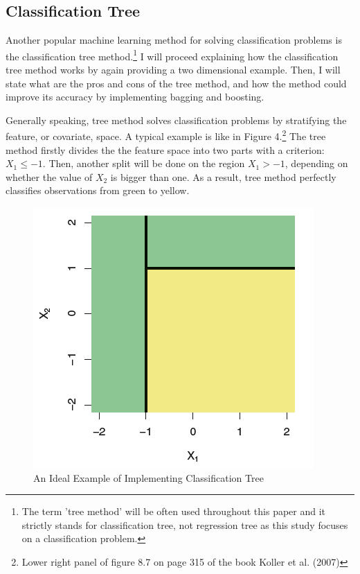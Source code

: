 \documentclass[11pt,a4paper,oneside]{article}
\begin{document}
\subsection{Classification Tree}
Another popular machine learning method for solving classification problems is the classification tree method.\footnote{The term 'tree method' will be often used throughout this paper and it strictly stands for classification tree, not regression tree as this study focuses on a classification problem.} I will proceed explaining how the classification tree method works by again providing a two dimensional example. Then, I will state what are the pros and cons of the tree method, and how the method could improve its accuracy by implementing bagging and boosting. 
\par
Generally speaking, tree method solves classification problems by stratifying the feature, or covariate, space. A typical example is like in Figure 4.\footnote{Lower right panel of figure 8.7 on page 315 of the book Koller et al. (2007)\cite{koller2007introduction}} The tree method firstly divides the the feature space into two parts with a criterion: $X_{1}\leq-1$. Then, another split will be done on the region $X_{1}>-1$, depending on whether the value of $X_{2}$ is bigger than one. As a result, tree method perfectly classifies observations from green to yellow. 
\begin{figure}[t!]
    \centering
    \includegraphics[scale = 0.7]{Figures/figure4.png}
    \caption{An Ideal Example of Implementing Classification Tree}
    \label{fig:figure4}
\end{figure}
\par
\end{document}

